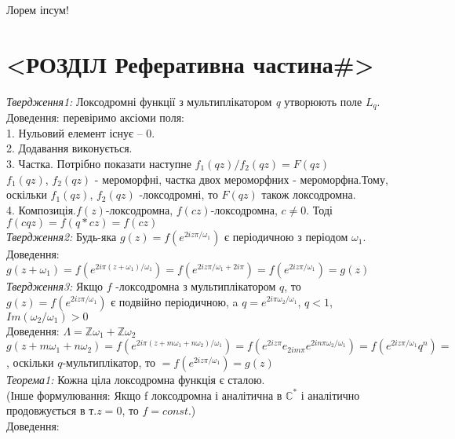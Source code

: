 \documentclass[12pt,a4paper]{article}
\begin{document}
Лорем іпсум!\cite{alias}

\clearpage

\section{<РОЗДІЛ Реферативна частина\#>}

\emph{Твердження1:} Локсодромні функції з мультиплікатором \textit{q} утворюють поле $L_{q}$. \\
Доведення: перевіримо аксіоми поля:\\
1. Нульовий елемент існує -- 0.\\
2. Додавання виконується.\\
3. Частка. Потрібно показати наступне $f_{1}(qz)/f_{2}(qz)=F(qz)$\\
$f_{1}(qz)$, $f_{2}(qz)$ - мероморфні, частка двох мероморфних - мероморфна.Тому, оскільки $f_{1}(qz)$, $f_{2}(qz)$ -локсодромні, то $ F(qz)$ також локсодромна.\\
4. Композиція.$f(z)$-локсодромна, $f(cz)$-локсодромна, $c \neq 0$. Тоді  $f(cqz)=f(q*cz)=f(cz)$\\

\emph{Твердження2:} Будь-яка $g(z)=f(e^{2iz\pi/\omega_{1}})$ є періодичною з періодом $\omega_{1}$.\\
Доведення: $g(  z+\omega_{1}  ) = f(  e^{  2i\pi (z+\omega_{1})  / \omega_{1}  }  ) =  f(  e^{  2iz\pi / \omega_{1}  +2i\pi } ) = f(  e^{  2iz\pi / \omega_{1}  } ) = g(z)$ \\

\emph{Твердження3:} Якщо $f$  -локсодромна з мультиплікатором $q$, то  $g(z)=f(e^{2iz\pi/\omega_{1}})$ є подвійно періодичною, a $q=e^{2i\pi \omega_{2}/ \omega_{1}}$, $q<1$, $Im(\omega_{2}/\omega_{1})>0$\\
Доведення: $ \Lambda = \mathbb{Z}\omega_{1} + \mathbb{Z}\omega_{2} $ \\
$g(z+m\omega_{1}+ n\omega_{2})= f(e^{2i\pi(z+m\omega_{1}+ n\omega_{2})/\omega_{1}})=f( e^{2iz\pi}e_{2im\pi}e^{2in\pi\omega_{2} / \omega_{1}} )=f(e^{2iz\pi/\omega_{1}}q^{n})= $, оскільки $q$-мультиплікатор, то
 $=f(e^{2iz\pi/\omega_{1}})=g(z)$\\
 
\emph{Теорема1:} Кожна ціла локсодромна функція є сталою.\\
(Інше формулювання: Якщо f локсодромна і аналітична в $\mathbb{C}^{*}$ і аналітично продовжується в т.$z=0$, то $f=const$.)\\
Доведення:\\
\\
\end{document}

